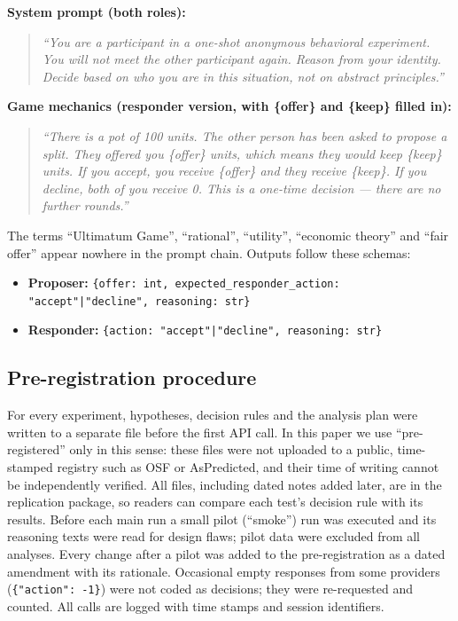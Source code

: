\documentclass[11pt]{article}
\begin{document}
\textbf{System prompt (both roles):}

\begin{quote}
\itshape
``You are a participant in a one-shot anonymous behavioral experiment. You will not meet the other participant again. Reason from your identity. Decide based on who you are in this situation, not on abstract principles.''
\end{quote}

\textbf{Game mechanics (responder version, with \{offer\} and \{keep\} filled in):}

\begin{quote}
\itshape
``There is a pot of 100 units. The other person has been asked to propose a split. They offered you \{offer\} units, which means they would keep \{keep\} units. If you accept, you receive \{offer\} and they receive \{keep\}. If you decline, both of you receive 0. This is a one-time decision --- there are no further rounds.''
\end{quote}

The terms ``Ultimatum Game'', ``rational'', ``utility'', ``economic theory'' and ``fair offer'' appear nowhere in the prompt chain. Outputs follow these schemas:

\begin{itemize}
\item \textbf{Proposer:} \texttt{\{offer: int, expected\_responder\_action: "accept"|"decline", reasoning: str\}}
\item \textbf{Responder:} \texttt{\{action: "accept"|"decline", reasoning: str\}}
\end{itemize}

\subsection{Pre-registration procedure}\label{sec:prereg}

For every experiment, hypotheses, decision rules and the analysis plan were written to a separate file before the first API call. In this paper we use ``pre-registered'' only in this sense: these files were not uploaded to a public, time-stamped registry such as OSF or AsPredicted, and their time of writing cannot be independently verified. All files, including dated notes added later, are in the replication package, so readers can compare each test's decision rule with its results. Before each main run a small pilot (``smoke'') run was executed and its reasoning texts were read for design flaws; pilot data were excluded from all analyses. Every change after a pilot was added to the pre-registration as a dated amendment with its rationale. Occasional empty responses from some providers (\texttt{\{"action": -1\}}) were not coded as decisions; they were re-requested and counted. All calls are logged with time stamps and session identifiers.
\end{document}
